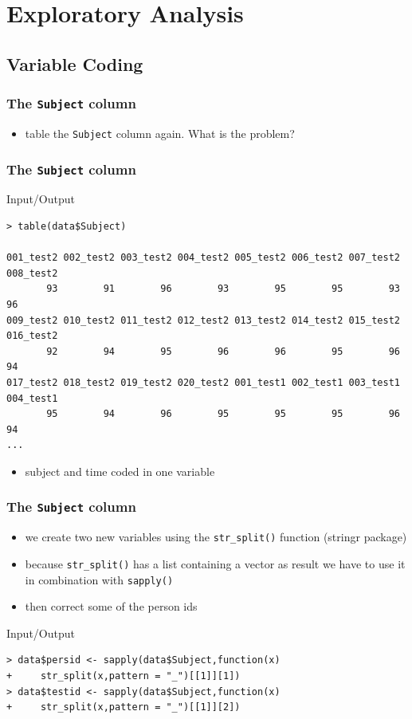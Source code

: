 \documentclass[xcolor={table},c]{beamer}
\begin{document}
\section{Exploratory Analysis}
\subsection{Variable Coding}
\begin{frame}[fragile]\frametitle{The \texttt{Subject} column}
  \begin{itemize}
  \item table the \texttt{Subject} column again. What is the problem?
  \end{itemize}
\end{frame}


\begin{frame}[fragile]\frametitle{The \texttt{Subject} column}
\begin{exampleblock}{Input/Output}\scriptsize
\begin{verbatim}
> table(data$Subject)

001_test2 002_test2 003_test2 004_test2 005_test2 006_test2 007_test2 008_test2 
       93        91        96        93        95        95        93        96 
009_test2 010_test2 011_test2 012_test2 013_test2 014_test2 015_test2 016_test2 
       92        94        95        96        96        95        96        94 
017_test2 018_test2 019_test2 020_test2 001_test1 002_test1 003_test1 004_test1 
       95        94        96        95        95        95        96        94 
...
\end{verbatim}
    \end{exampleblock}
\begin{itemize}
\item subject and time coded in one variable
\end{itemize}
\end{frame}



\begin{frame}[fragile]\frametitle{The \texttt{Subject} column}
  \begin{itemize}
  \item we create two new variables using the \texttt{str\_split()} function (stringr package)
  \item because \texttt{str\_split()} has a list containing a vector as result we have to use it in combination with \texttt{sapply()}
  \item then correct some of the person ids
  \end{itemize}
\begin{exampleblock}{Input/Output}\small
\begin{verbatim}
> data$persid <- sapply(data$Subject,function(x)
+     str_split(x,pattern = "_")[[1]][1])
> data$testid <- sapply(data$Subject,function(x)
+     str_split(x,pattern = "_")[[1]][2])
\end{verbatim}
    \end{exampleblock}
\end{frame}
\end{document}
